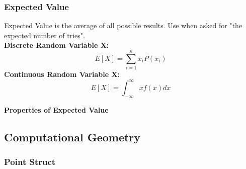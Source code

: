\documentclass[letterpaper,landscape]{article}
\begin{document}
\subsubsection{Expected Value}
Expected Value is the average of all possible results.
Use when asked for "the expected number of tries".\\
\textbf{Discrete Random Variable X:}
$$
  E[X] = \sum_{i=1}^n x_i P(x_i)
$$
\textbf{Continuous Random Variable X:}
$$
  E[X] = \int_{-\infty}^{\infty} x f(x)dx
$$

\noindent
\begin{minipage}{\columnwidth}
\textbf{Properties of Expected Value}
\begin{center}
\scriptsize 
\renewcommand{\arraystretch}{1} 
\end{center}
\end{minipage}

\subsection{Computational Geometry}

\subsubsection{Point Struct}


\end{document}

